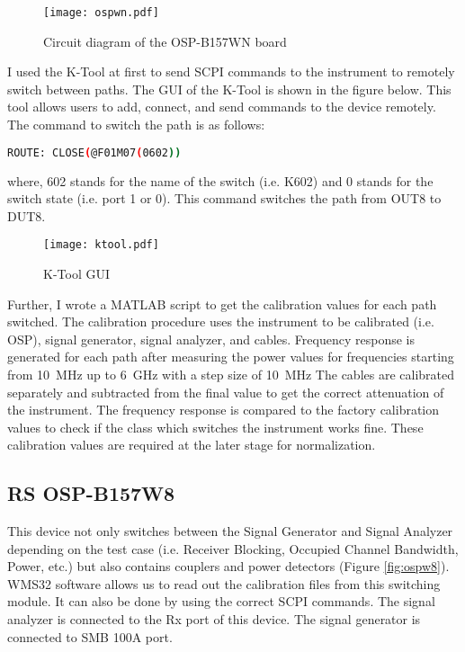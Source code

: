 \begin{figure}[H]
\centering
\texttt{[image: ospwn.pdf]}
\caption{Circuit diagram of the \acs{OSP}-B157WN board}
\label{fig:ospwn}
\end{figure}

I used the K-Tool at first to send \acs{SCPI} commands to the instrument to remotely switch between paths. The \acs{GUI} of the K-Tool is shown in the figure below. This tool allows users to add, connect, and send commands to the device remotely. The command to switch the path is as follows: 

\begin{lstlisting}[language=bash]
ROUTE: CLOSE(@F01M07(0602))
\end{lstlisting}

where, 602 stands for the name of the switch (i.e. K602) and 0 stands for the switch state (i.e. port 1 or 0). This command switches the path from OUT8 to DUT8. 

\begin{figure}[H]
\centering
\texttt{[image: ktool.pdf]}
\caption{K-Tool \acs{GUI}}
\label{fig:ktool}
\end{figure}

Further, I wrote a MATLAB\textregistered{} script to get the calibration values for each path switched. The calibration procedure uses the instrument to be calibrated (i.e. \acs{OSP}), signal generator, signal analyzer, and cables. Frequency response is generated for each path after measuring the power values for frequencies starting from 10~MHz up to 6~GHz with a step size of 10~MHz The cables are calibrated separately and subtracted from the final value to get the correct attenuation of the instrument. The frequency response is compared to the factory calibration values to check if the class which switches the instrument works fine. These calibration values are required at the later stage for normalization.

\subsection{\acs{RS}\textregistered{} \ac{OSP}-B157W8}
This device not only switches between the Signal Generator and Signal Analyzer depending on the test case (i.e. Receiver Blocking, Occupied Channel Bandwidth, Power, etc.) but also contains couplers and power detectors (Figure \ref{fig:ospw8}). WMS32 software allows us to read out the calibration files from this switching module. It can also be done by using the correct \acs{SCPI} commands. The signal analyzer is connected to the Rx port of this device. The signal generator is connected to SMB 100A port.

